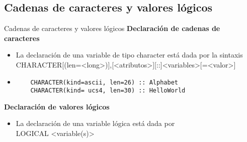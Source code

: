 
\subsection{Cadenas de caracteres y valores lógicos}

\begin{frame}[fragile]{Cadenas de caracteres y valores lógicos}
\textbf{Declaración de cadenas de caracteres}
 \begin{itemize}[<+(1)->]
  \item La declaración de una variable de tipo character está dada por la sintaxis\\ 
   \centering CHARACTER[(len=<long>)],[<atributos>][::]<variables>[=<valor>]
  \vspace{0.2cm}
  \item []
   \begin{verbatim}
    CHARACTER(kind=ascii, len=26) :: Alphabet
    CHARACTER(kind= ucs4, len=30) :: HelloWorld
   \end{verbatim}
 \end{itemize}

\textbf{Declaración de valores lógicos}
   \begin{itemize}[<+(2)->]
  \item La declaración de una variable lógica está dada por\\ 
   \centering LOGICAL <variable(s)>
 \end{itemize}
\end{frame}

